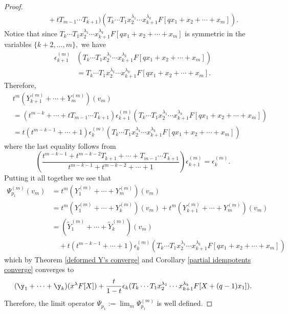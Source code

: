 \begin{proof}
\begin{align*}
          & \qquad + tT_{m-1}\cdots T_{k+1}) \left( T_{k}\cdots T_1x_2^{\lambda_1}\cdots x_{k+1}^{\lambda_{k}}F[qx_1+x_2+ \cdots + x_m] \right).
    \end{align*}
Notice that since $T_{k}\cdots T_1x_2^{\lambda_1}\cdots x_{k+1}^{\lambda_{k}}F[qx_1+x_2+ \cdots + x_m]$ is symmetric in the variables $\{k+2,\ldots,m\},$ we have
\begin{align*}
\epsilon_{k+1}^{(m)}&(T_{k}\cdots T_1x_2^{\lambda_1}\cdots x_{k+1}^{\lambda_{k}}F[qx_1+x_2+ \cdots + x_m]) \\
&= T_{k}\cdots T_1x_2^{\lambda_1}\cdots x_{k+1}^{\lambda_{k}}F[qx_1+x_2+ \cdots + x_m].
\end{align*}
Therefore, 
\begin{align*}
    &t^m(Y_{k+1}^{(m)}+ \cdots + Y_{m}^{(m)})(v_m) \\
    &= (t^{m-k}+\cdots+ tT_{m-1}\cdots T_{k+1})\epsilon_{k+1}^{(m)}(T_{k}\cdots T_1x_2^{\lambda_1}\cdots x_{k+1}^{\lambda_{k}}F[qx_1+x_2+ \cdots + x_m]) \\
    &= t(t^{m-k-1}+ \cdots + 1)\epsilon_{k}^{(m)}(T_{k}\cdots T_1x_2^{\lambda_1}\cdots x_{k+1}^{\lambda_{k}}F[qx_1+x_2+ \cdots + x_m])
\end{align*}
where the last equality follows from 
$$\left( \frac{t^{m-k-1}+ t^{m-k-2}T_{k+1}+\cdots+ T_{m-1}\cdots T_{k+1}}{t^{m-k-1}+ t^{m-k-2}+\cdots + 1} \right) \epsilon_{k+1}^{(m)} = \epsilon_{k}^{(m)}.$$ 
Putting it all together we see that 
\begin{align*}
    \Psi_{p_1}^{(m)}(v_m) &= t^m(Y_1^{(m)}+\cdots+Y_m^{(m)})(v_m) \\
    &= t^m(Y_1^{(m)}+\cdots+Y_k^{(m)})(v_m) + t^m(Y_{k+1}^{(m)}+\cdots+Y_m^{(m)})(v_m) \\
    &= (\widetilde{Y}_{1}^{(m)}+ \cdots + \widetilde{Y}_{k}^{(m)})(v_m) \\
    & \quad + t(t^{m-k-1}+ \cdots + 1)\epsilon_{k}^{(m)}(T_{k}\cdots T_1x_2^{\lambda_1}\cdots x_{k+1}^{\lambda_{k}}F[qx_1+x_2+ \cdots + x_m])
\end{align*}
which by Theorem \ref{deformed Y's converge} and Corollary \ref{partial idempotents converge} converges to 
$$(\y_1+ \cdots + \y_k)(x^{\lambda}F[X]) + \frac{t}{1-t}\epsilon_{k}(T_k\cdots T_1x_2^{\lambda_1}\cdots x_{k+1}^{\lambda_k}F[X+(q-1)x_1]) .$$ Therefore, the limit operator $\Psi_{p_1}:= \lim_{m} \Psi_{p_1}^{(m)}$ is well defined. 


\end{proof}
